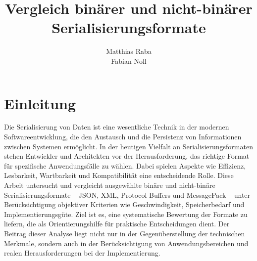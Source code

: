 \documentclass[ngerman]{seminarvorlage}
\begin{document}
\title{Vergleich binärer und nicht-binärer Serialisierungsformate}
\author{
  \alignauthor Matthias Raba \\
  \alignauthor Fabian Noll\\
}

\maketitle%
\newpage



\section{Einleitung}
Die Serialisierung von Daten ist eine wesentliche Technik in der modernen Softwareentwicklung, die den Austausch und die Persistenz von Informationen zwischen Systemen ermöglicht. In der heutigen Vielfalt an Serialisierungsformaten stehen Entwickler und Architekten vor der Herausforderung, das richtige Format für spezifische Anwendungsfälle zu wählen. Dabei spielen Aspekte wie Effizienz, Lesbarkeit, Wartbarkeit und Kompatibilität eine entscheidende Rolle. Diese Arbeit untersucht und vergleicht ausgewählte binäre und nicht-binäre Serialisierungsformate – JSON, XML, Protocol Buffers und MessagePack – unter Berücksichtigung objektiver Kriterien wie Geschwindigkeit, Speicherbedarf und Implementierungsgüte. Ziel ist es, eine systematische Bewertung der Formate zu liefern, die als Orientierungshilfe für praktische Entscheidungen dient. Der Beitrag dieser Analyse liegt nicht nur in der Gegenüberstellung der technischen Merkmale, sondern auch in der Berücksichtigung von Anwendungsbereichen und realen Herausforderungen bei der Implementierung.
\end{document}
